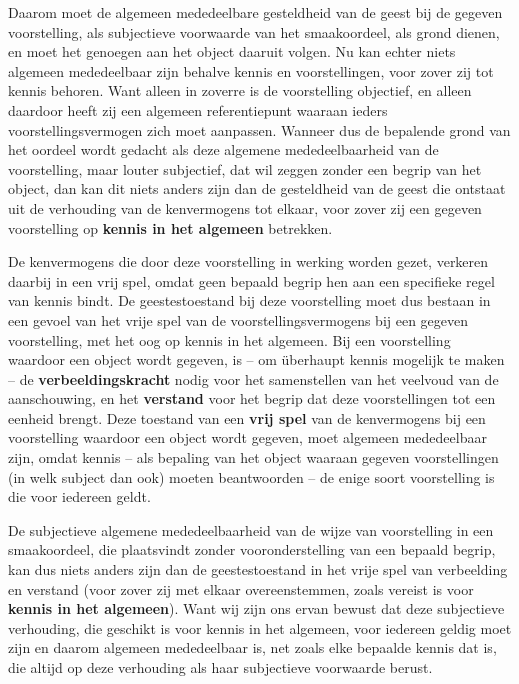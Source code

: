 Daarom moet de algemeen mededeelbare gesteldheid van de geest bij de gegeven voorstelling, als subjectieve voorwaarde van het smaakoordeel, als grond dienen, en moet het genoegen aan het object daaruit volgen. Nu kan echter niets algemeen mededeelbaar zijn behalve kennis en voorstellingen, voor zover zij tot kennis behoren. Want alleen in zoverre is de voorstelling objectief, en alleen daardoor heeft zij een algemeen referentiepunt waaraan ieders voorstellingsvermogen zich moet aanpassen.
Wanneer dus de bepalende grond van het oordeel wordt gedacht als deze algemene mededeelbaarheid van de voorstelling, maar louter subjectief, dat wil zeggen zonder een begrip van het object, dan kan dit niets anders zijn dan de gesteldheid van de geest die ontstaat uit de verhouding van de kenvermogens tot elkaar, voor zover zij een gegeven voorstelling op \textbf{kennis in het algemeen} betrekken.

De kenvermogens die door deze voorstelling in werking worden gezet, verkeren daarbij in een vrij spel, omdat geen bepaald begrip hen aan een specifieke regel van kennis bindt. De geestestoestand bij deze voorstelling moet dus bestaan in een gevoel van het vrije spel van de voorstellingsvermogens bij een gegeven voorstelling, met het oog op kennis in het algemeen.
Bij een voorstelling waardoor een object wordt gegeven, is – om überhaupt kennis mogelijk te maken – de \textbf{verbeeldingskracht} nodig voor het samenstellen van het veelvoud van de aanschouwing, en het \textbf{verstand} voor het begrip dat deze voorstellingen tot een eenheid brengt. Deze toestand van een \textbf{vrij spel} van de kenvermogens bij een voorstelling waardoor een object wordt gegeven, moet algemeen mededeelbaar zijn, omdat kennis – als bepaling van het object waaraan gegeven voorstellingen (in welk subject dan ook) moeten beantwoorden – de enige soort voorstelling is die voor iedereen geldt.

De subjectieve algemene mededeelbaarheid van de wijze van voorstelling in een smaakoordeel, die plaatsvindt zonder vooronderstelling van een bepaald begrip, kan dus niets anders zijn dan de geestestoestand in het vrije spel van verbeelding en verstand (voor zover zij met elkaar overeenstemmen, zoals vereist is voor \textbf{kennis in het algemeen}). Want wij zijn ons ervan bewust dat deze subjectieve verhouding, die geschikt is voor kennis in het algemeen, voor iedereen geldig moet zijn en daarom algemeen mededeelbaar is, net zoals elke bepaalde kennis dat is, die altijd op deze verhouding als haar subjectieve voorwaarde berust.

